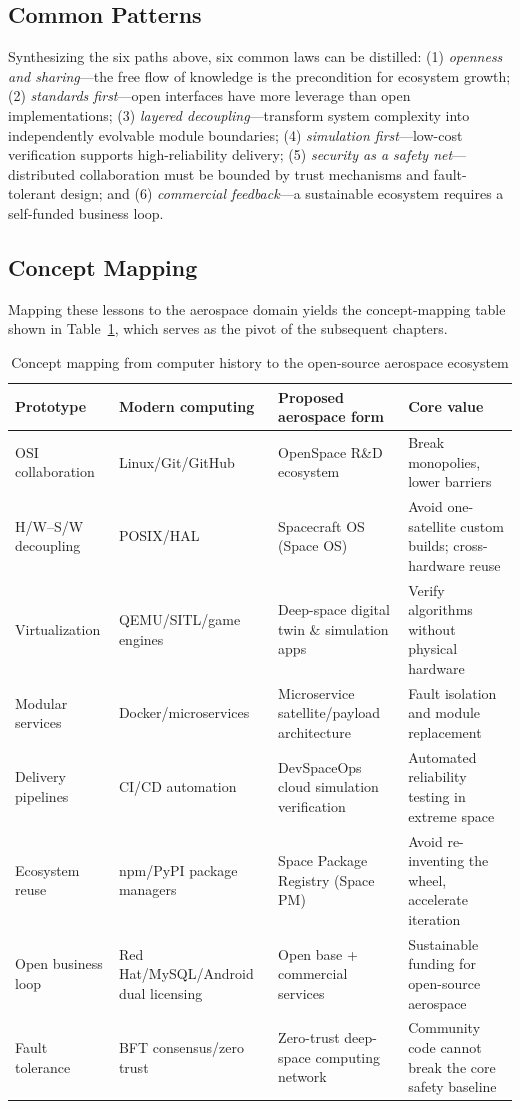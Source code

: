 \documentclass[11pt]{article}
\begin{document}
\subsection{Common Patterns}
Synthesizing the six paths above, six common laws can be distilled: (1) \emph{openness and sharing}---the free flow of knowledge is the precondition for ecosystem growth; (2) \emph{standards first}---open interfaces have more leverage than open implementations; (3) \emph{layered decoupling}---transform system complexity into independently evolvable module boundaries; (4) \emph{simulation first}---low-cost verification supports high-reliability delivery; (5) \emph{security as a safety net}---distributed collaboration must be bounded by trust mechanisms and fault-tolerant design; and (6) \emph{commercial feedback}---a sustainable ecosystem requires a self-funded business loop.

\subsection{Concept Mapping}
Mapping these lessons to the aerospace domain yields the concept-mapping table shown in Table~\ref{tab:mapping}, which serves as the pivot of the subsequent chapters.

\begin{table}
\centering
\caption{Concept mapping from computer history to the open-source aerospace ecosystem}
\label{tab:mapping}
\begin{tabularx}{\linewidth}{@{}>{\raggedright\arraybackslash}X>{\raggedright\arraybackslash}X>{\raggedright\arraybackslash}X>{\raggedright\arraybackslash}X@{}}
\toprule
Prototype & Modern computing & Proposed aerospace form & Core value \\
\midrule
OSI collaboration & Linux/Git/GitHub & OpenSpace R\&D ecosystem & Break monopolies, lower barriers \\
H/W--S/W decoupling & POSIX/HAL & Spacecraft OS (Space OS) & Avoid one-satellite custom builds; cross-hardware reuse \\
Virtualization & QEMU/SITL/game engines & Deep-space digital twin \& simulation apps & Verify algorithms without physical hardware \\
Modular services & Docker/microservices & Microservice satellite/payload architecture & Fault isolation and module replacement \\
Delivery pipelines & CI/CD automation & DevSpaceOps cloud simulation verification & Automated reliability testing in extreme space \\
Ecosystem reuse & npm/PyPI package managers & Space Package Registry (Space PM) & Avoid re-inventing the wheel, accelerate iteration \\
Open business loop & Red Hat/MySQL/Android dual licensing & Open base + commercial services & Sustainable funding for open-source aerospace \\
Fault tolerance & BFT consensus/zero trust & Zero-trust deep-space computing network & Community code cannot break the core safety baseline \\
\bottomrule
\end{tabularx}
\end{table}
\end{document}
